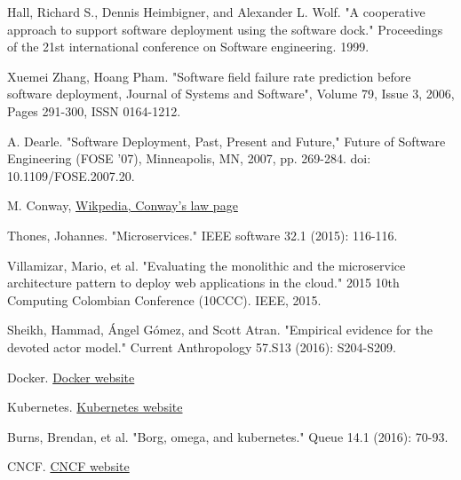 \documentclass[conference]{IEEEtran}
\begin{document}
\begin{thebibliography}{00}

     Hall, Richard S., Dennis Heimbigner, and Alexander L. Wolf. "A cooperative approach to support software deployment using the software dock." Proceedings of the 21st international conference on Software engineering. 1999.

     Xuemei Zhang, Hoang Pham. "Software field failure rate prediction before software deployment, Journal of Systems and Software", Volume 79, Issue 3, 2006, Pages 291-300, ISSN 0164-1212.

     A. Dearle. "Software Deployment, Past, Present and Future," Future of Software Engineering (FOSE '07), Minneapolis, MN, 2007, pp. 269-284. doi: 10.1109/FOSE.2007.20.

     M. Conway, \href{https://en.wikipedia.org/wiki/Conway%27s_law}{Wikpedia, Conway's law page}

     Thones, Johannes. "Microservices." IEEE software 32.1 (2015): 116-116.

     Villamizar, Mario, et al. "Evaluating the monolithic and the microservice architecture pattern to deploy web applications in the cloud." 2015 10th Computing Colombian Conference (10CCC). IEEE, 2015.

     Sheikh, Hammad, Ángel Gómez, and Scott Atran. "Empirical evidence for the devoted actor model." Current Anthropology 57.S13 (2016): S204-S209.

     Docker. \href{https://www.docker.com}{Docker website}

     Kubernetes. \href{https://kubernetes.io}{Kubernetes website}

     Burns, Brendan, et al. "Borg, omega, and kubernetes." Queue 14.1 (2016): 70-93.

     CNCF. \href{https://www.cncf.io}{CNCF website}
\end{thebibliography}
\vspace{12pt}
\end{document}
